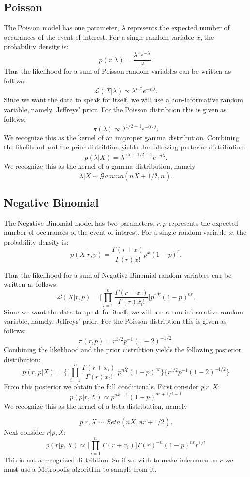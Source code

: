 \documentclass{article}\usepackage[]{graphicx}\usepackage[]{color}
\begin{document}
\subsection{Poisson}
\label{ss:mPoisson}
The Poisson model has one parameter, $\lambda$ represents the expected number of occurances of the event of interest. For a single random variable $x$, the probability density is:
$$p(x|\lambda)=\frac{\lambda^xe^{-\lambda}}{x!}.$$
Thus the likelihood for a sum of Poisson random variables can be written as follows:
$$\mathcal{L}(X|\lambda)\propto\lambda^{n\bar{X}}e^{-n\lambda}.$$ 
Since we want the data to speak for itself, we will use a non-informative random variable, namely, Jeffreys' prior. For the Poisson distribtion this is given as follows:
$$\pi(\lambda)\propto\lambda^{1/2-1}e^{-0\cdot\lambda}.$$
We recognize this as the kernel of an improper gamma distribution. Combining the likelihood and the prior distribtion yields the following posterior distribution:
$$p(\lambda|X)=\lambda^{n\bar{X}+1/2-1}e^{-n\lambda}.$$
We recognize this as the kernel of a gamma distribution, namely
$$\lambda|X\sim\mathcal{G}amma(n\bar{X}+1/2,n).$$

\subsection{Negative Binomial}
\label{ss:mNBinom}
The Negative Binomial model has two parameters, $r,p$ represents the expected number of occurances of the event of interest. For a single random variable $x$, the probability density is:
$$p(X|r,p)=\frac{\Gamma(r+x)}{\Gamma(r)x!}p^{x}(1-p)^{r}.$$

Thus the likelihood for a sum of Negative Binomial random variables can be written as follows:
$$\mathcal{L}(X|r,p)=\Bigg[\prod_{i=1}^n\frac{\Gamma(r+x_i)}{\Gamma(r)x_i!}\Bigg]p^{n\bar{X}}(1-p)^{nr}.$$
Since we want the data to speak for itself, we will use a non-informative random variable, namely, Jeffreys' prior. For the Poisson distribtion this is given as follows:
$$\pi(r,p)=r^{1/2}p^{-1}(1-2)^{-1/2}.$$
Combining the likelihood and the prior distribtion yields the following posterior distribution:
$$p(r,p|X)=\Bigg\{\Bigg[\prod_{i=1}^n\frac{\Gamma(r+x_i)}{\Gamma(r)x_i!}\Bigg]p^{n\bar{X}}(1-p)^{nr}\Bigg\}\Bigg\{r^{1/2}p^{-1}(1-2)^{-1/2}\Bigg\}$$
From this posterior we obtain the full conditionals. First consider $p|r,X$:
$$p(p|r,X)\propto p^{n\bar{x}-1}(1-p)^{nr+1/2-1}$$
We recognize this as the kernel of a beta distribution, namely

$$p|r,X\sim\mathcal{B}eta(n\bar{X},nr+1/2).$$
Next consider $r|p,X$:
$$p(r|p,X)\propto\bigg[\prod_{i=1}^n\Gamma(r+x_i)\bigg]\Gamma(r)^{-n}(1-p)^{nr}r^{1/2}$$
This is not a recognized distribtion. So if we wish to make inferences on $r$ we must use a Metropolis algorithm to sample from it.
\end{document}
